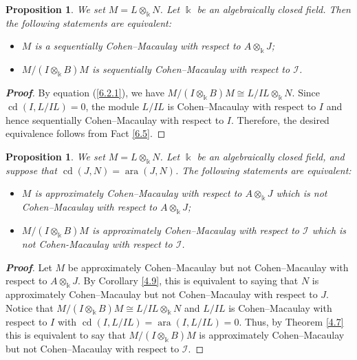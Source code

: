 \documentclass[10pt,a4paper]{amsart}
\numberwithin{equation}{theorem}
\newtheorem{proposition}[theorem]{Proposition}
\theoremstyle{definition}
\theoremstyle{fact}
\theoremstyle{conjecture}
\newcommand{\ara}{\operatorname{ara}}
\newcommand{\cd}{\operatorname{cd}}
\newenvironment{prf}[1][Proof]{\begin{proof}[\bf #1]}{\end{proof}}
\begin{document}
\begin{proposition}
\label{6.6}
We set $M=L\otimes_\Bbbk N$. Let $\Bbbk$ be an algebraically closed
field. Then the following statements are equivalent:
 \begin{itemize}
\item[{(a)}]  $M$ is a sequentially Cohen--Macaulay with respect to $A \otimes_\Bbbk J$;
\item[{(b)}] $M/(I \otimes_\Bbbk B)M$ is sequentially Cohen--Macaulay with respect to $\mathcal{I}$.
 \end{itemize}
\end{proposition}
\begin{prf}
By equation (\ref{6.2.1}), we have $M/(I \otimes_\Bbbk B)M\cong L/IL\otimes_\Bbbk N$.
 Since $\cd(I, L/IL)=0$, the module $L/IL$ is Cohen--Macaulay with respect to $I$ and hence sequentially Cohen--Macaulay with respect to $I$.
 Therefore, the desired equivalence follows from Fact \ref{6.5}.
\end{prf}
\vspace{.2cm}
\vspace{.3cm}
\begin{proposition}
\label{6.7}
We set $M=L\otimes_\Bbbk N$. Let $\Bbbk$ be an algebraically closed field, and suppose that
$\cd(J,N)=\ara(J,N)$. The following statements are equivalent:
 \begin{itemize}
\item[{(a)}]  $M$ is approximately Cohen--Macaulay with respect to $A \otimes_\Bbbk J$ which is not Cohen--Macaulay with respect to $A \otimes_\Bbbk J$;
\item[{(b)}] $M/(I \otimes_\Bbbk B)M$ is approximately Cohen--Macaulay with respect to $\mathcal{I}$ which is not Cohen-Macaulay with respect to $\mathcal{I}$.
 \end{itemize}
\end{proposition}
\begin{prf}
Let $M$ be approximately Cohen--Macaulay but not Cohen--Macaulay
with respect to $A \otimes_\Bbbk J$. By Corollary \ref{4.9}, this is
equivalent to saying that $N$ is approximately Cohen--Macaulay but
not Cohen--Macaulay with respect to $J$.
Notice that $M/(I \otimes_\Bbbk B)M\cong L/IL\otimes_\Bbbk N$ and $L/IL$ is Cohen--Macaulay with respect to $I$ with $\cd(I, L/IL)=\ara(I, L/IL)=0$.
 Thus, by Theorem \ref{4.7} this is equivalent to say that $M/(I \otimes_\Bbbk B)M$ is approximately Cohen--Macaulay but not Cohen--Macaulay with respect to $\mathcal{I}$.
\end{prf}
\end{document}
